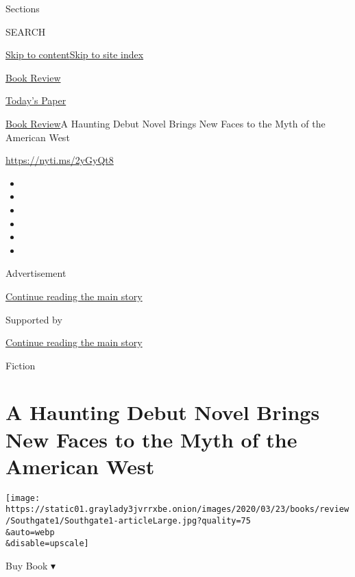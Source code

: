 Sections

SEARCH

\protect\hyperlink{site-content}{Skip to
content}\protect\hyperlink{site-index}{Skip to site index}

\href{https://www.nytimes3xbfgragh.onion/section/books/review}{Book
Review}

\href{https://myaccount.nytimes3xbfgragh.onion/auth/login?response_type=cookie\&client_id=vi}{}

\href{https://www.nytimes3xbfgragh.onion/section/todayspaper}{Today's
Paper}

\href{/section/books/review}{Book Review}\textbar{}A Haunting Debut
Novel Brings New Faces to the Myth of the American West

\url{https://nyti.ms/2yGyQt8}

\begin{itemize}
\item
\item
\item
\item
\item
\item
\end{itemize}

Advertisement

\protect\hyperlink{after-top}{Continue reading the main story}

Supported by

\protect\hyperlink{after-sponsor}{Continue reading the main story}

Fiction

\hypertarget{a-haunting-debut-novel-brings-new-faces-to-the-myth-of-the-american-west}{%
\section{A Haunting Debut Novel Brings New Faces to the Myth of the
American
West}\label{a-haunting-debut-novel-brings-new-faces-to-the-myth-of-the-american-west}}

\texttt{[image: https://static01.graylady3jvrrxbe.onion/images/2020/03/23/books/review/Southgate1/Southgate1-articleLarge.jpg?quality=75\\\&auto=webp\\\&disable=upscale]}

Buy Book ▾

